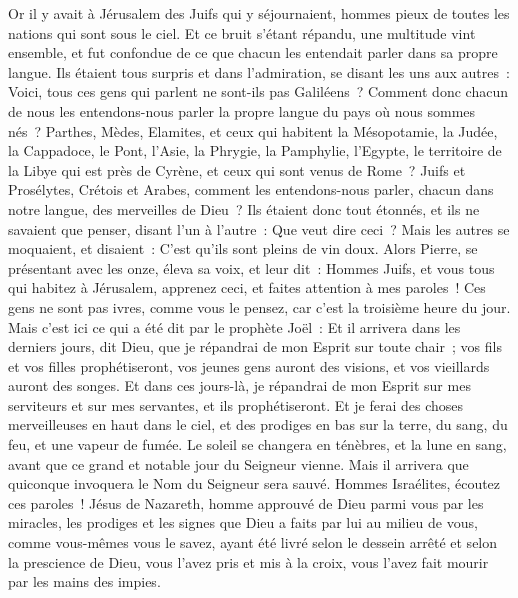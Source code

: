 \begin{multicols}{2}
Or il y avait à Jérusalem des Juifs qui y séjournaient, hommes pieux de toutes les nations qui sont sous le ciel.
Et ce bruit s'étant répandu, une multitude vint ensemble, et fut confondue de ce que chacun les entendait parler dans sa propre langue.
Ils étaient tous surpris et dans l'admiration, se disant les uns aux autres~: Voici, tous ces gens qui parlent ne sont-ils pas Galiléens~?
Comment donc chacun de nous les entendons-nous parler la propre langue du pays où nous sommes nés~?
Parthes, Mèdes, Elamites, et ceux qui habitent la Mésopotamie, la Judée, la Cappadoce, le Pont, l'Asie,
la Phrygie, la Pamphylie, l'Egypte, le territoire de la Libye qui est près de Cyrène, et ceux qui sont venus de Rome~? Juifs et Prosélytes,
Crétois et Arabes, comment les entendons-nous parler, chacun dans notre langue, des merveilles de Dieu~?
Ils étaient donc tout étonnés, et ils ne savaient que penser, disant l'un à l'autre~: Que veut dire ceci~?
Mais les autres se moquaient, et disaient~: C'est qu'ils sont pleins de vin doux.
Alors Pierre, se présentant avec les onze, éleva sa voix, et leur dit~: Hommes Juifs, et vous tous qui habitez à Jérusalem, apprenez ceci, et faites attention à mes paroles~!
Ces gens ne sont pas ivres, comme vous le pensez, car c'est la troisième heure du jour.
Mais c'est ici ce qui a été dit par le prophète Joël~:
Et il arrivera dans les derniers jours, dit Dieu, que je répandrai de mon Esprit sur toute chair~; vos fils et vos filles prophétiseront, vos jeunes gens auront des visions, et vos vieillards auront des songes.
Et dans ces jours-là, je répandrai de mon Esprit sur mes serviteurs et sur mes servantes, et ils prophétiseront.
Et je ferai des choses merveilleuses en haut dans le ciel, et des prodiges en bas sur la terre, du sang, du feu, et une vapeur de fumée.
Le soleil se changera en ténèbres, et la lune en sang, avant que ce grand et notable jour du Seigneur vienne.
Mais il arrivera que quiconque invoquera le Nom du Seigneur sera sauvé.
Hommes Israélites, écoutez ces paroles~! Jésus de Nazareth, homme approuvé de Dieu parmi vous par les miracles, les prodiges et les signes que Dieu a faits par lui au milieu de vous, comme vous-mêmes vous le savez,
ayant été livré selon le dessein arrêté et selon la prescience de Dieu, vous l'avez pris et mis à la croix, vous l'avez fait mourir par les mains des impies.

\end{multicols}
